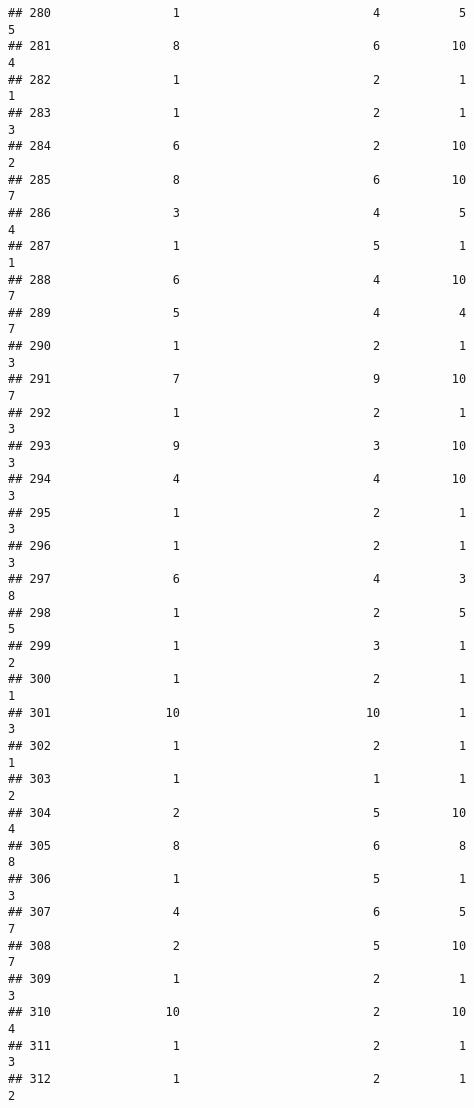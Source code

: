 \documentclass[
]{article}
\begin{document}
\begin{verbatim}
## 280                 1                           4           5               5
## 281                 8                           6          10               4
## 282                 1                           2           1               1
## 283                 1                           2           1               3
## 284                 6                           2          10               2
## 285                 8                           6          10               7
## 286                 3                           4           5               4
## 287                 1                           5           1               1
## 288                 6                           4          10               7
## 289                 5                           4           4               7
## 290                 1                           2           1               3
## 291                 7                           9          10               7
## 292                 1                           2           1               3
## 293                 9                           3          10               3
## 294                 4                           4          10               3
## 295                 1                           2           1               3
## 296                 1                           2           1               3
## 297                 6                           4           3               8
## 298                 1                           2           5               5
## 299                 1                           3           1               2
## 300                 1                           2           1               1
## 301                10                          10           1               3
## 302                 1                           2           1               1
## 303                 1                           1           1               2
## 304                 2                           5          10               4
## 305                 8                           6           8               8
## 306                 1                           5           1               3
## 307                 4                           6           5               7
## 308                 2                           5          10               7
## 309                 1                           2           1               3
## 310                10                           2          10               4
## 311                 1                           2           1               3
## 312                 1                           2           1               2

\end{verbatim}
\end{document}
